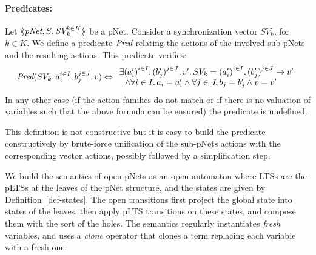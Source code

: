 \documentclass{lncs/llncs}
\newcommand{\Pred}{\symb{Pred}}
\begin{document}
\paragraph{Predicates:}
Let
$\mylangle\overline{\pNet},\overline{S},\symb{SV}_k^{k\in K} \myrangle$
be a pNet. Consider a synchronization vector $SV_k$, for $k\in K$. We define a
predicate $\Pred$ relating
the actions of the involved sub-pNets and the resulting actions. This predicate verifies:
\[\Pred(SV_k, a_i^{i\in I}, b_j^{j\in J}, v)\Leftrightarrow
\begin{array}{l}
\exists {(a'_i)}^{i\in I},
{(b'_j)}^{j\in J},v'.\, SV_k={(a'_i)}^{i\in I}, {(b'_j)}^{j\in J}\rightarrow v'
\\~~\land
\forall i\in I.\, a_i=a'_i\land \forall j \in J.\, b_j=b'_j \land v=v'
\end{array}\]
In any other case (if the action families do not match or if there is no valuation of
variables such that the above formula can be ensured) the predicate is undefined.

This definition is not constructive but it is easy to build the predicate constructively
by brute-force unification of the sub-pNets
actions with the corresponding vector actions, possibly followed by a simplification
step.


We build the semantics of open pNets as an open automaton where LTSs are the pLTSs at
the leaves of the pNet structure, and the states are given by 
Definition~\ref{def-states}. The open transitions first
 project the global state into states of the leaves, then apply
pLTS transitions on these states, and compose them with the sort of the holes. %
The semantics   regularly instantiates \emph{fresh} variables, and uses a
\emph{clone} operator that clones a term replacing each variable with a
fresh one.
\end{document}
